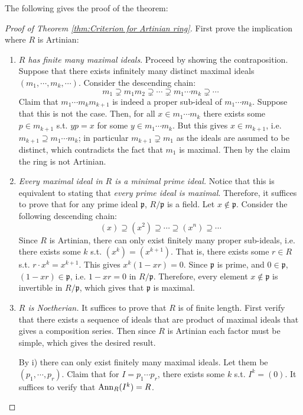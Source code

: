 \documentclass{article}
\begin{document}
The following gives the proof of the theorem:\

\begin{proof}[Proof of Theorem \ref{thm:Criterion for Artinian ring}]
    First prove the implication where $R$ is Artinian:
    \begin{enumerate}[label=\roman*)]
        \item \emph{$R$ has finite many maximal ideals}. Proceed by showing the contraposition. Suppose that there exists infinitely many distinct maximal ideals $(m_1, \cdots, m_k, \cdots)$. Consider the descending chain:
        \[
            m_1 \supsetneq m_1 m_2 \supsetneq \cdots \supsetneq m_1\cdots m_k \supsetneq \cdots
        \]
        Claim that $m_1\cdots m_k m_{k+1}$ is indeed a proper sub-ideal of $m_1\cdots m_k$. Suppose that this is not the case. Then, for all $x\in m_1\cdots m_k$ there exists some $p\in m_{k+1}$ s.t. $yp = x$ for some $y\in m_1\cdots m_k$. But this gives $x\in m_{k+1}$, i.e. $m_{k+1} \supseteq m_1\cdots m_k$; in particular $m_{k+1} \supsetneq m_1$ as the ideals are assumed to be distinct, which contradicts the fact that $m_1$ is maximal. Then by the claim the ring is not Artinian.
        \item \emph{Every maximal ideal in $R$ is a minimal prime ideal.} Notice that this is equivalent to stating that \emph{every prime ideal is maximal}. Therefore, it suffices to prove that for any prime ideal $\mathfrak{p}$, $R/\mathfrak{p}$ is a field. Let $x\notin \mathfrak{p}$. Consider the following descending chain:
        \[
            (x) \supseteq (x^2) \supseteq \cdots \supseteq (x^n) \supseteq \cdots
        \]
        Since $R$ is Artinian, there can only exist finitely many proper sub-ideals, i.e. there exists some $k$ s.t. $(x^k) = (x^{k+1})$. That is, there exists some $r\in R$ s.t. $r\cdot x^k = x^{k+1}$. This gives $x^k(1 - xr) = 0$. Since $\mathfrak{p}$ is prime, and $0\in\mathfrak{p}$, $(1 - xr) \in \mathfrak{p}$, i.e. $1 - xr = 0$ in $R/\mathfrak{p}$. Therefore, every element $x\notin \mathfrak{p}$ is invertible in $R/\mathfrak{p}$, which gives that $\mathfrak{p}$ is maximal.
        \item \emph{$R$ is Noetherian.} It suffices to prove that $R$ is of finite length. First verify that there exists a sequence of ideals that are product of maximal ideals that gives a composition series. Then since $R$ is Artinian each factor must be simple, which gives the desired result.
        
        By i) there can only exist finitely many maximal ideals. Let them be $(p_1, \cdots, p_r)$. Claim that for $I = p_1\cdots p_r$, there exists some $k$ s.t. $I^k = (0)$. It suffices to verify that $\mathrm{Ann}_{R}(I^k) = R$. 


\end{enumerate}
\end{proof}
\end{document}
